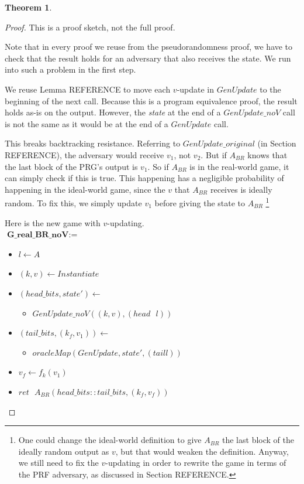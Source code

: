 \documentclass[12pt,lot, lof]{puthesis}
\newenvironment{game}
{ \begin{itemize}[noitemsep,nolistsep] 
}
{ \end{itemize}                  }
\newcommand{\s} {\textrm{ }}
\newcommand{\lar}{\leftarrow}
\newtheorem{thm}{Theorem}
\begin{document}
{\begin{thm}
\end{thm}
\begin{proof} This is a proof sketch, not the full proof.

Note that in every proof we reuse from the pseudorandomness proof, we have to check that the result holds for an adversary that also receives the state. We run into such a problem in the first step.

We reuse Lemma REFERENCE to move each $v$-update in $GenUpdate$ to the beginning of the next call. Because this is a program equivalence proof, the result holds as-is on the output. However, the \emph{state} at the end of a $GenUpdate\_noV$ call is not the same as it would be at the end of a $GenUpdate$ call. 

This breaks backtracking resistance. Referring to $GenUpdate\_original$ (in Section REFERENCE), the adversary would receive $v_1$, not $v_2$. But if $A_{BR}$ knows that the last block of the PRG's output is $v_1$. So if $A_{BR}$ is in the real-world game, it can simply check if this is true. This happening has a negligible probability of happening in the ideal-world game, since the $v$ that $A_{BR}$ receives is ideally random. To fix this, we simply update $v_1$ before giving the state to $A_{BR}$ \footnote{One could change the ideal-world definition to give $A_{BR}$ the last block of the ideally random output as $v$, but that would weaken the definition. Anyway, we still need to fix the $v$-updating in order to rewrite the game in terms of the PRF adversary, as discussed in Section REFERENCE.}

Here is the new game with $v$-updating.\\

$\textbf{G\_real\_BR\_noV} := $
\begin{game}
\item[] $l \leftarrow A$
\item[] $(k,v) \leftarrow Instantiate$
\item[] $(head\_bits, state') \lar$
  \begin{game}
    \item[]  $GenUpdate\_noV((k, v), (head \s l))$
  \end{game}
\item[] $(tail\_bits, (k_f, v_1)) \lar$
  \begin{game}
    \item[] $oracleMap(GenUpdate,state',(tail l))$
  \end{game}
\item[] $v_f \lar f_k(v_1)$
\item[] $ret \s A_{BR}(head\_bits :: tail\_bits, (k_f, v_f))$ \\
\end{game}


\end{proof}}
\end{document}
